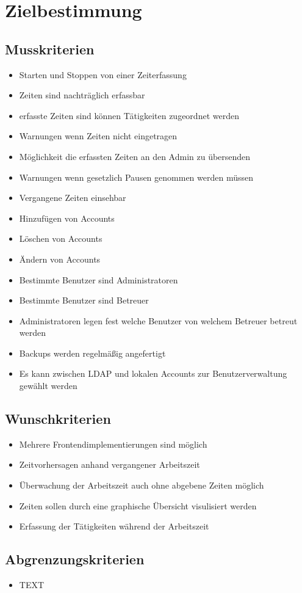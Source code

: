 \section{Zielbestimmung}

\subsection{Musskriterien}

\begin{itemize}
	\item Starten und Stoppen von einer Zeiterfassung
	\item Zeiten sind nachträglich erfassbar
	\item erfasste Zeiten sind können Tätigkeiten zugeordnet werden
	\item Warnungen wenn Zeiten nicht eingetragen
	\item Möglichkeit die erfassten Zeiten an den Admin zu übersenden
	\item Warnungen wenn gesetzlich Pausen genommen werden müssen
	\item Vergangene Zeiten einsehbar
	\item Hinzufügen von Accounts
	\item Löschen von Accounts
	\item Ändern von Accounts
	\item Bestimmte Benutzer sind Administratoren
	\item Bestimmte Benutzer sind Betreuer
	\item Administratoren legen fest welche Benutzer von welchem Betreuer betreut werden
	\item Backups werden regelmäßig angefertigt
	\item Es kann zwischen LDAP und lokalen Accounts zur Benutzerverwaltung gewählt werden
\end{itemize}


\subsection{Wunschkriterien}

\begin{itemize}
	\item Mehrere Frontendimplementierungen sind möglich
	\item Zeitvorhersagen anhand vergangener Arbeitszeit
	\item Überwachung der Arbeitszeit auch ohne abgebene Zeiten möglich
	\item Zeiten sollen durch eine graphische Übersicht visulisiert werden
	\item Erfassung der Tätigkeiten während der Arbeitszeit

\end{itemize}


\subsection{Abgrenzungskriterien}
\begin{itemize}
	\item TEXT
\end{itemize}
